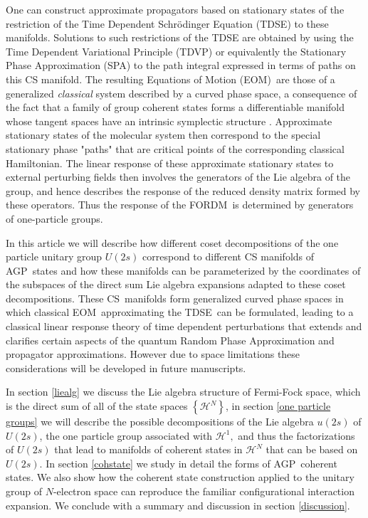 \documentclass[12pt,aps,amsfonts,amssymb,tightenlines]{revtex4}%
\begin{document}
One can construct approximate propagators based on stationary states of the
restriction of the Time Dependent Schr\"{o}dinger Equation (TDSE) to these
manifolds. Solutions to such restrictions of the TDSE are obtained by using
the Time Dependent Variational Principle (TDVP) \cite{Kramer81} or
equivalently the Stationary Phase Approximation (SPA) \cite{Schulman81} to the
path integral expressed in terms of paths on this CS manifold. The resulting
Equations of Motion (EOM)\ are those of a generalized \emph{classical }system
described by a curved phase space, a consequence of the fact that a family of
group coherent states forms a differentiable manifold \cite{Helgason78} whose
tangent spaces have an intrinsic symplectic structure \cite{Encyclo}.
Approximate stationary states of the molecular system then correspond to the
special stationary phase "paths" that are critical points of the corresponding
classical Hamiltonian. The linear response of these approximate stationary
states to external perturbing fields then involves the generators of the Lie
algebra of the group, and hence describes the response of the reduced density
matrix formed by these operators. Thus the response of the FORDM\ is
determined by generators of one-particle groups.

In this article we will describe how different coset decompositions of the one
particle unitary group $U(2s)$ correspond to different CS manifolds of
AGP\ states and how these manifolds can be parameterized by the coordinates of
the subspaces of the direct sum Lie algebra expansions adapted to these coset
decompositions. These CS\ manifolds form generalized curved phase spaces in
which classical EOM\ approximating the TDSE\ can be formulated, leading to a
classical linear response theory of time dependent perturbations that extends
and clarifies certain aspects of the quantum Random Phase Approximation and
propagator approximations. However due to space limitations these
considerations will be developed in future manuscripts.

In section \ref{liealg} we discuss the Lie algebra structure of Fermi-Fock
space, which is the direct sum of all of the state spaces $\left\{
\mathcal{H}^{N}\right\}  $, in section \ref{one particle groups} we will
describe the possible decompositions of the Lie algebra $u\left(  2s\right)  $
of $U(2s)$, the one particle group associated with $\mathcal{H}^{1},$ and thus
the factorizations of $U(2s)$ that lead to manifolds of coherent states in
$\mathcal{H}^{N}$ that can be based on $U(2s)$. In section \ref{cohstate} we
study in detail the forms of AGP\ coherent states. We also show how the
coherent state construction applied to the unitary group of $N$-electron space
can reproduce the familiar configurational interaction expansion. We conclude
with a summary and discussion in section \ref{discussion}.
\end{document}
